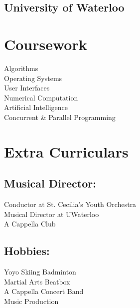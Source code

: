 \documentclass[letterpaper]{kevin-resume} %
\begin{document}
{\begin{minipage}[t]{0.30\textwidth}
\subsection{University of Waterloo}


\sectionspace %


\section{Coursework}

Algorithms \\
Operating Systems \\
User Interfaces \\
Numerical Computation \\
Artificial Intelligence \\
Concurrent \& Parallel Programming

\sectionspace %



\section{Extra Curriculars}
\subsection{Musical Director:}
\textbullet{} Conductor at St. Cecilia’s Youth Orchestra \\
\textbullet{} Musical Director at UWaterloo \\A Cappella Club
\sectionspace %
\subsection{Hobbies:}
Yoyo \textbullet{} 
Skiing \textbullet{} 
Badminton \\
Martial Arts \textbullet{} 
Beatbox \\ 
A Cappella \textbullet{} 
Concert Band \\ 
Music Production

\end{minipage}} %
\end{document}
